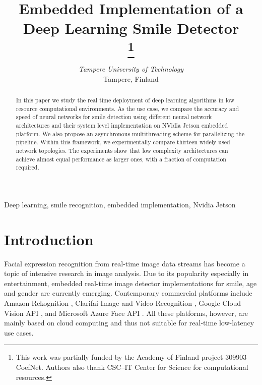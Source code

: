 \documentclass[conference]{IEEEtran}
\begin{document}
\title{Embedded Implementation of a Deep Learning Smile Detector\\
\thanks{This work was partially funded by the Academy of Finland
project 309903 CoefNet. Authors also thank CSC--IT Center for Science for computational resources.}
}

\author{
\textit{Tampere University of Technology}\\
Tampere, Finland}

\maketitle

\begin{abstract}
In this paper we study the real time deployment of deep learning algorithms in low resource computational environments. As the use case, we compare the accuracy and speed of neural networks for smile detection using different neural network architectures and their system level implementation on NVidia Jetson embedded platform. We also propose an asynchronous multithreading scheme for parallelizing the pipeline. Within this framework, we experimentally compare thirteen widely used network topologies. The experiments show that low complexity architectures can achieve almost equal performance as larger ones, with a fraction of computation required.
\end{abstract}

\begin{IEEEkeywords}
Deep learning, smile recognition, embedded implementation, Nvidia Jetson
\end{IEEEkeywords}

\section{Introduction}

 Facial expression recognition from real-time image data streams has become a topic of intensive research in image analysis. Due to its popularity especially in entertainment, embedded real-time image detector implementations for smile, age and gender are currently emerging. Contemporary commercial platforms include Amazon Rekognition \cite{a1}, Clarifai Image and Video Recognition \cite{a2}, Google Cloud Vision API \cite{a3}, and Microsoft Azure Face API \cite{a4}. All these platforms, however, are mainly based on cloud computing and thus not suitable for real-time low-latency use cases.
\end{document}
